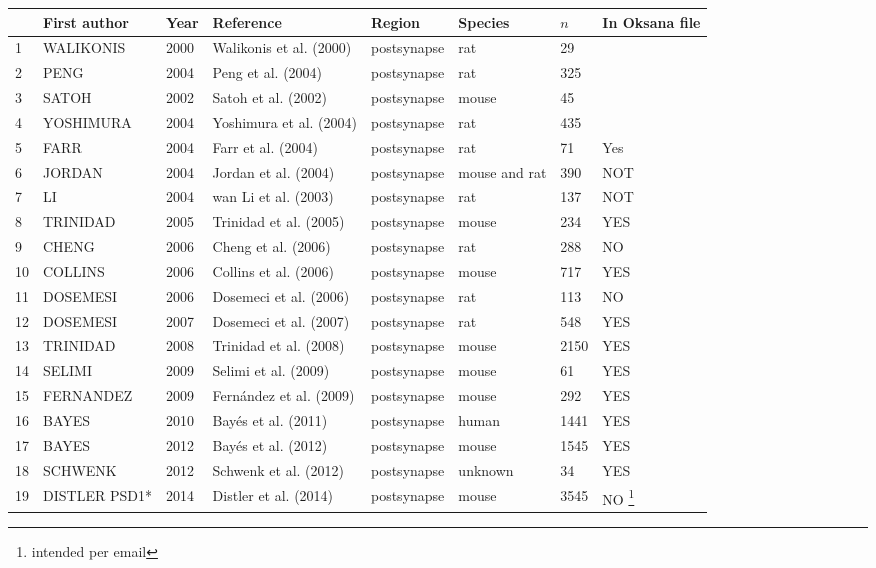 \begin{table}[]
    \centering
    \begin{tabular}{llllllll}
    \toprule
     & First author & Year & Reference & Region & Species & $n$ & In Oksana file \\
    \midrule
1 &    WALIKONIS &2000 &Walikonis et al. (2000)\cite{walikonis2000identification} &postsynapse & rat & 29 \\
2 &PENG&2004&Peng et al. (2004) \cite{peng2004semiquantitative}&postsynapse& rat& 325\\
3 &SATOH&2002&Satoh et al. (2002)\cite{satoh2002identification} &postsynapse &mouse &45\\
4 &YOSHIMURA&2004&Yoshimura et al. (2004) \cite{yoshimura2004molecular} &postsynapse& rat &435\\
5 &FARR&2004&Farr et al. (2004)  \cite{farr2004proteomic}&postsynapse &rat &71 &Yes\\
6 &JORDAN&2004&Jordan et al. (2004)&postsynapse &mouse and rat &390& NOT\\
7&LI&2004 &wan Li et al. (2003)&postsynapse &rat& 137& NOT\\
8&TRINIDAD&2005 &Trinidad et al. (2005) \cite{trinidad2005phosphorylation}&postsynapse&mouse& 234& YES\\
9&CHENG&2006&Cheng et al. (2006)&postsynapse& rat& 288& NO\\
10&COLLINS&2006&Collins et al. (2006)\cite{collins2006molecular}&postsynapse &mouse& 717& YES\\
11&DOSEMESI&2006&Dosemeci et al. (2006)&postsynapse& rat& 113& NO\\
12&DOSEMESI&2007&Dosemeci et al. (2007)&postsynapse& rat& 548& YES\\
13&TRINIDAD&2008&Trinidad et al. (2008)&postsynapse& mouse& 2150& YES\\
14&SELIMI&2009&Selimi et al. (2009)\cite{selimi2009proteomic}&postsynapse &mouse &61& YES\\
15&FERNANDEZ&2009&Fernández et al. (2009)  \cite{fernandez2009targeted}&postsynapse& mouse &292& YES\\
16&BAYES&2010&Bayés et al. (2011)&postsynapse &human &1441& YES\\
17&BAYES&2012&Bayés et al. (2012)&postsynapse &mouse &1545 &YES\\
18&SCHWENK&2012&Schwenk et al. (2012) \cite{schwenk2012high}&postsynapse &unknown &34& YES\\
19&DISTLER PSD1*&2014&Distler et al. (2014)&postsynapse& mouse& 3545& NO \footnote{intended per email}\\

\end{tabular}
\end{table}
